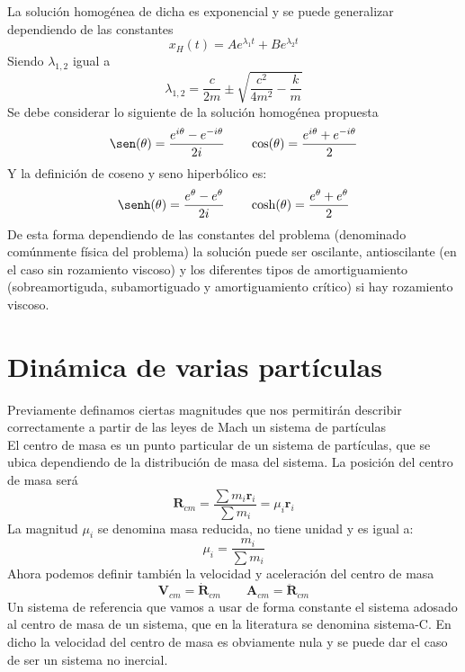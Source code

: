 \documentclass[a4paper]{article}
\numberwithin{equation}{section}
\begin{document}
	La solución homogénea de dicha es exponencial y se puede generalizar dependiendo de las constantes
	\begin{equation}
		x_H(t) = A e^{\lambda_1 t} + B e^{\lambda_2 t}
	\end{equation}
	Siendo $\lambda_{1,2}$ igual a 
	\begin{equation}
	\lambda_{1,2} = \frac{c}{2m} \pm \sqrt{\frac{c^2}{4 m^2} - \frac{k}{m}}
	\end{equation}
	Se debe considerar lo siguiente de la solución homogénea propuesta
	\begin{equation}
		\sen(\theta) = \frac{e^{i \theta} - e^{-i \theta}}{2i} \qquad \cos(\theta) = \frac{e^{i \theta} + e^{-i \theta}}{2}
	\end{equation}
	Y la definición de coseno y seno hiperbólico es:
	\begin{equation}
		\senh(\theta) = \frac{e^{\theta} - e^{\theta}}{2i} \qquad \cosh(\theta) = \frac{e^{\theta} + e^{\theta}}{2}
	\end{equation}
	De esta forma dependiendo de las constantes del problema (denominado comúnmente física del problema) la solución puede ser oscilante, antioscilante (en el caso sin rozamiento viscoso) y los diferentes tipos de amortiguamiento (sobreamortiguda, subamortiguado y amortiguamiento crítico) si hay rozamiento viscoso.
\section{Dinámica de varias partículas}
	
	Previamente definamos ciertas magnitudes que nos permitirán describir correctamente a partir de las leyes de Mach un sistema de partículas\\
	El centro de masa es un punto particular de un sistema de partículas, que se ubica dependiendo de la distribución de masa del sistema. La posición del centro de masa será
	\begin{equation}
		\boldsymbol{R}_{cm} = \frac{\sum m_i \boldsymbol{r}_i}{\sum m_i} = \mu_i \boldsymbol{r}_i
	\end{equation}
	La magnitud $\mu_i$ se denomina masa reducida, no tiene unidad y es igual a: 
	\begin{equation}
		\mu_i = \frac{m_i}{\sum m_i}
	\end{equation}
	Ahora podemos definir también la velocidad y aceleración del centro de masa
	\begin{equation}
		\boldsymbol{V}_{cm} = \dot{\boldsymbol{R}}_{cm} \qquad \boldsymbol{A}_{cm} = \ddot{\boldsymbol{R}}_{cm}
	\end{equation}
	Un sistema de referencia que vamos a usar de forma constante el sistema adosado al centro de masa de un sistema, que en la literatura se denomina sistema-C. En dicho la velocidad del centro de masa es obviamente nula y se puede dar el caso de ser un sistema no inercial.
\end{document}
